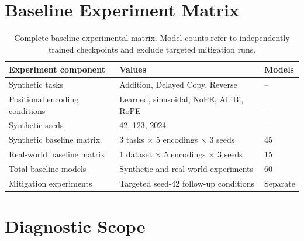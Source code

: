 \documentclass[
    author={Aanchala Ravindra Bhongade},
    supervisor={Dr. Fernando Moreno-Pino},
    degree={MSc},
    title={Length Generalisation in Transformer-Based Sequence Models: Failure Taxonomy and Mitigation Strategies},
    subtitle={},
    type={},
    year={2026}
]{dissertation}
\begin{document}
\section{Baseline Experiment Matrix}
\label{app:experiment-matrix}

\begin{table}[htbp]
\centering
\small
\renewcommand{\arraystretch}{1.15}
\begin{tabular}{
    p{}
    p{}
    p{}
}
\hline
\textbf{Experiment component} &
\textbf{Values} &
\textbf{Models} \\
\hline
Synthetic tasks &
Addition, Delayed Copy, Reverse &
-- \\

Positional encoding conditions &
Learned, sinusoidal, NoPE, ALiBi, RoPE &
-- \\

Synthetic seeds &
42, 123, 2024 &
-- \\

Synthetic baseline matrix &
3 tasks $\times$ 5 encodings $\times$ 3 seeds &
45 \\

Real-world baseline matrix &
1 dataset $\times$ 5 encodings $\times$ 3 seeds &
15 \\

Total baseline models &
Synthetic and real-world experiments &
60 \\

Mitigation experiments &
Targeted seed-42 follow-up conditions &
Separate \\
\hline
\end{tabular}
\caption{Complete baseline experimental matrix. Model counts refer to
independently trained checkpoints and exclude targeted mitigation runs.}
\label{tab:appendix-experiment-matrix}
\end{table}

\section{Diagnostic Scope}
\label{app:diagnostic-scope}
\end{document}
